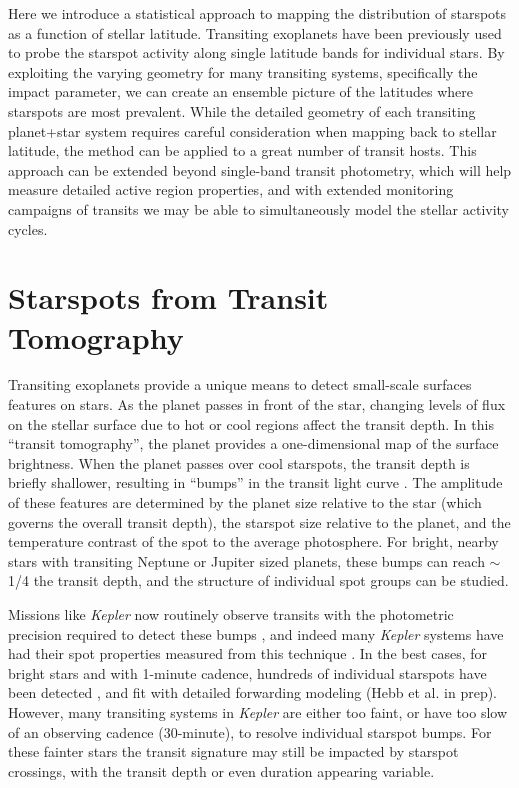 \documentclass[preprint2]{aastex61}
\newcommand{\Kepler}{\textsl{Kepler}\xspace}
\begin{document}
Here we introduce a statistical approach to mapping the distribution of starspots as a function of stellar latitude. Transiting exoplanets have been previously used to probe the starspot activity along single latitude bands for individual stars. By exploiting the varying geometry for many transiting systems, specifically the impact parameter, we can create an ensemble picture of the latitudes where starspots are most prevalent. While the detailed geometry of each transiting planet+star system requires careful consideration when mapping back to stellar latitude, the method can be applied to a great number of transit hosts. This approach can be extended beyond single-band transit photometry, which will help measure detailed active region properties, and with extended monitoring campaigns of transits we may be able to simultaneously model the stellar activity cycles.





\section{Starspots from Transit Tomography}
\label{sec:transit}

Transiting exoplanets provide a unique means to detect small-scale surfaces features on stars. As the planet passes in front of the star, changing levels of flux on the stellar surface due to hot or cool regions affect the transit depth. In this ``transit tomography'', the planet provides a one-dimensional map of the surface brightness. When the planet passes over cool starspots, the transit depth is briefly shallower, resulting in ``bumps'' in the transit light curve \citep{silva2003}. The amplitude of these features are determined by the planet size relative to the star (which governs the overall transit depth), the starspot size relative to the planet, and the temperature contrast of the spot to the average photosphere. For bright, nearby stars with transiting Neptune or Jupiter sized planets, these bumps can reach $\sim$1/4 the transit depth, and the structure of individual spot groups can be studied. 

Missions like \Kepler now routinely observe transits with the photometric precision required to detect these bumps \citep{borucki2010}, and indeed many \Kepler systems have had their spot properties measured from this technique \citep[e.g.][]{sanchis-ojeda2011, sanchis-ojeda2013}. In the best cases, for bright stars and with 1-minute cadence, hundreds of individual starspots have been detected \citep[e.g.][]{davenport_phd}, and fit with detailed forwarding modeling (Hebb et al. in prep). However, many transiting systems in \Kepler are either too faint, or have too slow of an observing cadence (30-minute), to resolve individual starspot bumps. For these fainter stars the transit signature may still be impacted by starspot crossings, with the transit depth or even duration appearing variable. 
\end{document}

